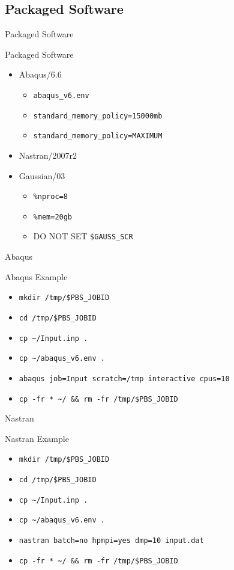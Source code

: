 \documentclass[handout]{beamer}
\begin{document}
\subsection{Packaged Software}
\begin{frame}{Packaged Software}
\begin{block}{Packaged Software}
 \begin{itemize}
  \item<1>{Abaqus/6.6}
  \begin{itemize}
   \item{\texttt{abaqus\_v6.env}}
   \item{\texttt{standard\_memory\_policy=15000mb}}
   \item{\texttt{standard\_memory\_policy=MAXIMUM}}
  \end{itemize}
  \item<2>{Nastran/2007r2}
  \item<3->{Gaussian/03}
  \begin{itemize}
   \item{\texttt{\%nproc=8}}
   \item{\texttt{\%mem=20gb}}
   \item<4->{\alert{DO NOT SET \texttt{\$GAUSS\_SCR}}}
  \end{itemize}
 \end{itemize}
\end{block}
\end{frame}
\begin{frame}{Abaqus}
\begin{block}{Abaqus Example}
  \begin{itemize}[<+-| alert@+>]
   \item{\texttt{mkdir /tmp/\$PBS\_JOBID}}
   \item{\texttt{cd /tmp/\$PBS\_JOBID}}
   \item{\texttt{cp \~{}/Input.inp .}}
   \item{\texttt{cp \~{}/abaqus\_v6.env .}}
   \item{\texttt{abaqus job=Input scratch=/tmp interactive cpus=10}}
   \item{\texttt{cp -fr * \~{}/ \&\& rm -fr /tmp/\$PBS\_JOBID}}
  \end{itemize}
\end{block}
\end{frame}
\begin{frame}{Nastran}
\begin{block}{Nastran Example}
  \begin{itemize}[<+-| alert@+>]
   \item{\texttt{mkdir /tmp/\$PBS\_JOBID}}
   \item{\texttt{cd /tmp/\$PBS\_JOBID}}
   \item{\texttt{cp \~{}/Input.inp .}}
   \item{\texttt{cp \~{}/abaqus\_v6.env .}}
   \item{\texttt{nastran batch=no hpmpi=yes dmp=10 input.dat}}
   \item{\texttt{cp -fr * \~{}/ \&\& rm -fr /tmp/\$PBS\_JOBID}}
 \end{itemize}
\end{block}
\end{frame}
\end{document}
